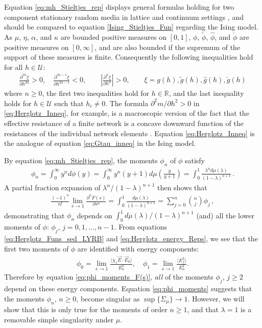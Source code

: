 \documentclass[english,12pt,jmp,graphicx]{revtex4-1}
\newcommand{\ph}{\hat{\phi}}
\begin{document}
%
Equation \eqref{eq:mh_Stieltjes_rep} displays general formulas
holding for two component stationary random media in lattice and
continuum settings \cite{Golden:PRL-3935}, and should be compared to
equation \eqref{Ising_Stieltjes_Fun} regarding the Ising model.       
As $\mu$, $\eta$, $\alpha$, and $\kappa$ are bounded positive measures on
$[0,1]$, $\phi$, $\tilde{\phi}$, $\ph$, and $\check{\phi}$ are positive
measures on $[0,\infty]$, and are also bounded if the supremum of the
support of these measures is finite. Consequently the following
inequalities hold for all $h\in\mathcal{U}$: 
%
\begin{align}\label{eq:Herglotz_Inneq}
  \frac{\partial^{2n}\xi}{\partial h^{2n}}>0, \quad
  \frac{\partial^{2n-1}\xi}{\partial h^{2n-1}}<0, \qquad
  \left|\frac{\partial^n\xi}{\partial h^n}\right|>0, \qquad
  \xi=g(h),\tilde{g}(h),\hat{g}(h),\check{g}(h)
\end{align}
%
where $n\geq0$, the first two inequalities hold for $h\in\mathbb{R}$, and
the last inequality holds for $h\in\mathcal{U}$ such that $h_i\neq0$. The
formula $\partial^2m/\partial h^2>0$ in \eqref{eq:Herglotz_Inneq}, for
example, is a macroscopic version of
the fact that the effective resistance of a finite network is a
concave downward function of the resistances of the individual network
elements \cite{Golden:JMP-5627}. Equation \eqref{eq:Herglotz_Inneq} is
the analogue of equation \eqref{eq:Gtau_inneq} in the Ising model.

By equation \eqref{eq:mh_Stieltjes_rep}, the moments $\phi_n$ of $\phi$
satisfy  
%
\begin{align}\label{eq:phi_moments}
  \phi_n=\int_0^\infty y^nd\phi(y)
    =\int_0^\infty y^n(y+1)d\mu\left(\frac{y}{y+1}\right)
    =\int_0^1\frac{\lambda^nd\mu(\lambda)}{(1-\lambda)^{n+1}}\,.
\end{align}
%
A partial fraction expansion of $\lambda^n/(1-\lambda)^{n+1}$ then shows that
%
\begin{align}\label{eq:phi_moments_F(s)}
  \frac{(-1)^n}{n!}\lim_{s\to1}\frac{\partial^nF(s)}{\partial s^n}=\int_0^1\frac{d\mu(\lambda)}{(1-\lambda)^{n+1}}
                                =\sum_{j=0}^n{n \choose j} \phi_j\,,
\end{align}
%
demonstrating that $\phi_n$ depends on $\int_0^1d\mu(\lambda)/(1-\lambda)^{n+1}$
(and) all the lower moments of $\phi$: $\phi_j$, $j=0,1,\ldots,n-1$.
From equations \eqref{eq:Herglotz_Funs_sed_LYRB} and
\eqref{eq:Herglotz_energy_Reps}, we see that the first two moments of
$\phi$ are identified with energy components:    
%
\begin{align}\label{eq:phi_energy_relations}
  \phi_0=\lim_{s\to1}\frac{\langle\chi_1\vec{E}\cdot\vec{E}_0\rangle}{E_0^2},   \quad
  \phi_1=\lim_{s\to1}\frac{\langle E_f^2\rangle}{E_0^2}.
\end{align}
%
Therefore by equation \eqref{eq:phi_moments_F(s)}, \emph{all} of the
moments $\phi_j$, $j\geq2$ depend on these energy components. Equation
\eqref{eq:phi_moments} suggests that the moments $\phi_n$, $n\geq0$, become
singular as $\sup\{\Sigma_\mu\}\to1$. However, we will show that this is only
true for the moments of order $n\geq1$, and that $\lambda=1$ is a removable
simple singularity under $\mu$. 
\end{document}
